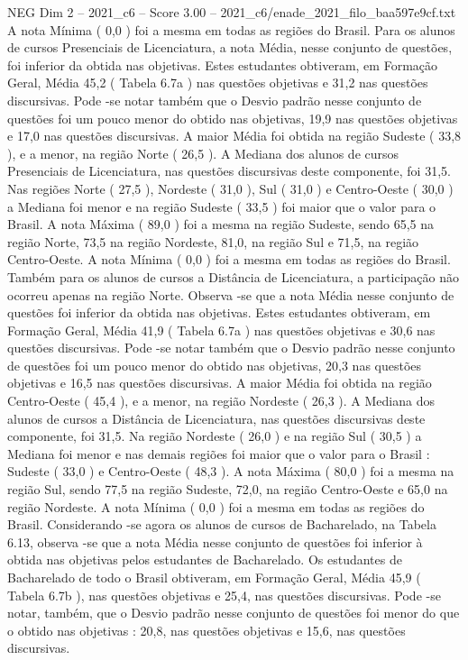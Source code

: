 \begin{textsample}{NEG Dim 2 – 2021\_c6 – Score 3.00 – 2021\_c6/enade\_2021\_filo\_baa597e9cf.txt}
A nota Mínima ( 0,0 ) foi a mesma em todas as regiões do Brasil.
Para os alunos de cursos Presenciais de Licenciatura, a nota Média, nesse conjunto de questões, foi inferior da obtida nas objetivas.
Estes estudantes obtiveram, em Formação Geral, Média 45,2 ( Tabela 6.7a ) nas questões objetivas e 31,2 nas questões discursivas.
Pode -se notar também que o Desvio padrão nesse conjunto de questões foi um pouco menor do obtido nas objetivas, 19,9 nas questões objetivas e 17,0 nas questões discursivas.
A maior Média foi obtida na região Sudeste ( 33,8 ), e a menor, na região Norte ( 26,5 ).
A Mediana dos alunos de cursos Presenciais de Licenciatura, nas questões discursivas deste componente, foi 31,5.
Nas regiões Norte ( 27,5 ), Nordeste ( 31,0 ), Sul ( 31,0 ) e Centro-Oeste ( 30,0 ) a Mediana foi menor e na região Sudeste ( 33,5 ) foi maior que o valor para o Brasil.
A nota Máxima ( 89,0 ) foi a mesma na região Sudeste, sendo 65,5 na região Norte, 73,5 na região Nordeste, 81,0, na região Sul e 71,5, na região Centro-Oeste.
A nota Mínima ( 0,0 ) foi a mesma em todas as regiões do Brasil.
Também para os alunos de cursos a Distância de Licenciatura, a participação não ocorreu apenas na região Norte.
Observa -se que a nota Média nesse conjunto de questões foi inferior da obtida nas objetivas.
Estes estudantes obtiveram, em Formação Geral, Média 41,9 ( Tabela 6.7a ) nas questões objetivas e 30,6 nas questões discursivas.
Pode -se notar também que o Desvio padrão nesse conjunto de questões foi um pouco menor do obtido nas objetivas, 20,3 nas questões objetivas e 16,5 nas questões discursivas.
A maior Média foi obtida na região Centro-Oeste ( 45,4 ), e a menor, na região Nordeste ( 26,3 ).
A Mediana dos alunos de cursos a Distância de Licenciatura, nas questões discursivas deste componente, foi 31,5.
Na região Nordeste ( 26,0 ) e na região Sul ( 30,5 ) a Mediana foi menor e nas demais regiões foi maior que o valor para o Brasil : Sudeste ( 33,0 ) e Centro-Oeste ( 48,3 ).
A nota Máxima ( 80,0 ) foi a mesma na região Sul, sendo 77,5 na região Sudeste, 72,0, na região Centro-Oeste e 65,0 na região Nordeste.
A nota Mínima ( 0,0 ) foi a mesma em todas as regiões do Brasil.
Considerando -se agora os alunos de cursos de Bacharelado, na Tabela 6.13, observa -se que a nota Média nesse conjunto de questões foi inferior à obtida nas objetivas pelos estudantes de Bacharelado.
Os estudantes de Bacharelado de todo o Brasil obtiveram, em Formação Geral, Média 45,9 ( Tabela 6.7b ), nas questões objetivas e 25,4, nas questões discursivas.
Pode -se notar, também, que o Desvio padrão nesse conjunto de questões foi menor do que o obtido nas objetivas : 20,8, nas questões objetivas e 15,6, nas questões discursivas.

\end{textsample}

